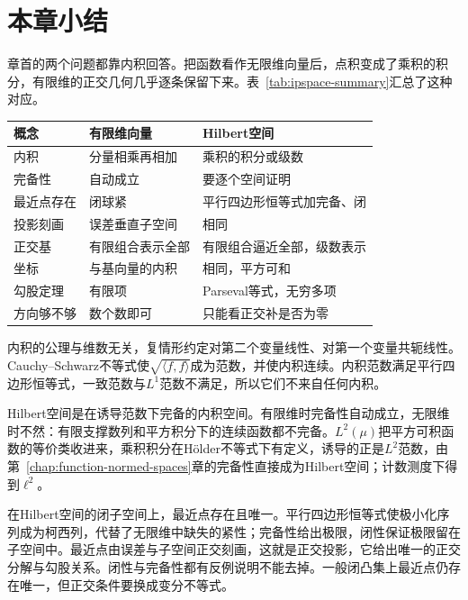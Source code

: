 \section{本章小结}
\label{sec:ipspace-summary}

章首的两个问题都靠内积回答。把函数看作无限维向量后，点积变成了乘积的积分，有限维的正交几何几乎逐条保留下来。表~\ref{tab:ipspace-summary}汇总了这种对应。

\begin{BookInlineTable}
  \centering
  \begin{tabular}{@{}p{20mm}p{38mm}p{44mm}@{}}
    \toprule
    概念 & 有限维向量 & Hilbert空间\\
    \midrule
    内积 & 分量相乘再相加 & 乘积的积分或级数\\
    完备性 & 自动成立 & 要逐个空间证明\\
    最近点存在 & 闭球紧 & 平行四边形恒等式加完备、闭\\
    投影刻画 & 误差垂直子空间 & 相同\\
    正交基 & 有限组合表示全部 & 有限组合逼近全部，级数表示\\
    坐标 & 与基向量的内积 & 相同，平方可和\\
    勾股定理 & 有限项 & Parseval等式，无穷多项\\
    方向够不够 & 数个数即可 & 只能看正交补是否为零\\
    \bottomrule
  \end{tabular}
  \caption{内积几何在有限维向量与无限维Hilbert空间中的对照。}
  \label{tab:ipspace-summary}
\end{BookInlineTable}

内积的公理与维数无关，复情形约定对第二个变量线性、对第一个变量共轭线性。Cauchy--Schwarz不等式使$\sqrt{\langle f,f\rangle}$成为范数，并使内积连续。内积范数满足平行四边形恒等式，一致范数与$L^1$范数不满足，所以它们不来自任何内积。

Hilbert空间是在诱导范数下完备的内积空间。有限维时完备性自动成立，无限维时不然：有限支撑数列和平方积分下的连续函数都不完备。$L^2(\mu)$把平方可积函数的等价类收进来，乘积积分在Hölder不等式下有定义，诱导的正是$L^2$范数，由第~\ref{chap:function-normed-spaces}章的完备性直接成为Hilbert空间；计数测度下得到$\ell^2$。

在Hilbert空间的闭子空间上，最近点存在且唯一。平行四边形恒等式使极小化序列成为柯西列，代替了无限维中缺失的紧性；完备性给出极限，闭性保证极限留在子空间中。最近点由误差与子空间正交刻画，这就是正交投影，它给出唯一的正交分解与勾股关系。闭性与完备性都有反例说明不能去掉。一般闭凸集上最近点仍存在唯一，但正交条件要换成变分不等式。

